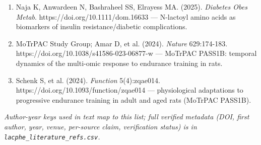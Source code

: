 \documentclass[11pt]{article}
\begin{document}
\begin{enumerate}
\item Naja K, Anwardeen N, Bashraheel SS, Elrayess MA. (2025). \textit{Diabetes Obes Metab}. https://doi.org/10.1111/dom.16633 --- N-lactoyl amino acids as biomarkers of insulin resistance/diabetic complications.
\item MoTrPAC Study Group; Amar D, et al. (2024). \textit{Nature} 629:174-183. https://doi.org/10.1038/s41586-023-06877-w --- MoTrPAC PASS1B: temporal dynamics of the multi-omic response to endurance training in rats.
\item Schenk S, et al. (2024). \textit{Function} 5(4):zqae014. https://doi.org/10.1093/function/zqae014 --- physiological adaptations to progressive endurance training in adult and aged rats (MoTrPAC PASS1B).
\end{enumerate}

\textit{Author-year keys used in text map to this list; full verified metadata (DOI, first author, year, venue, per-source claim, verification status) is in \texttt{lacphe\_literature\_refs.csv}.}
\end{document}
